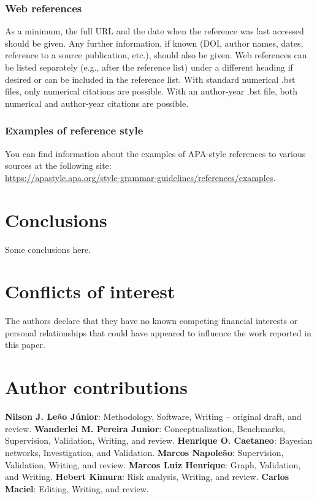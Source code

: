 \documentclass[12pt,a4paper]{article}
\begin{document}
\subsubsection{Web references}
As a minimum, the full URL and the date when the reference was last accessed should be given. Any further information, if known (DOI, author names, dates, reference to a source publication, etc.), should also be given. Web references can be listed separately (e.g., after the reference list) under a different heading if desired or can be included in the reference list. With standard numerical .bst files, only numerical citations are possible. With an author-year .bst file, both numerical and author-year citations are possible. 

\subsubsection{Examples of reference style}
You can find information about the examples of APA-style references to various sources at the following site:\\
\url{https://apastyle.apa.org/style-grammar-guidelines/references/examples}.


\section{Conclusions}
Some conclusions here.


\section*{Conflicts of interest} 
The authors declare that they have no known competing financial interests or personal relationships that could have appeared to influence the work reported in this paper.

\section*{Author contributions}

\noindent\textbf{Nilson J. Leão Júnior}: Methodology, Software, Writing – original draft, and review. \textbf{Wanderlei M. Pereira Junior}: Conceptualization, Benchmarks, Supervision, Validation, Writing, and review. \textbf{Henrique O. Caetaneo}: Bayesian networks, Investigation, and Validation. \textbf{Marcos Napoleão}: Supervision, Validation, Writing, and review. \textbf{Marcos Luiz Henrique}: Graph, Validation, and Writing. \textbf{Hebert Kimura}: Risk analysis, Writing, and review. \textbf{Carlos Maciel}: Editing, Writing, and review.
\end{document}
